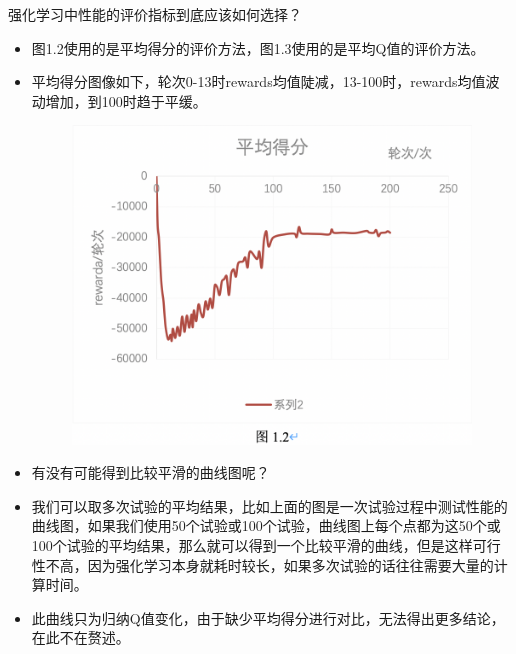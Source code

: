 \documentclass{beamer}
\begin{document}
\begin{frame}{强化学习中性能的评价指标到底应该如何选择？}
    \begin{itemize}
    \tiny
    \item 图1.2使用的是平均得分的评价方法，图1.3使用的是平均Q值的评价方法。
    \item 平均得分图像如下，轮次0-13时rewards均值陡减，13-100时，rewards均值波动增加，到100时趋于平缓。

    
        \begin{minipage}{0.5\linewidth}
        \medskip
        \begin{figure}[h]
            \centering
            \includegraphics[height=.4\textheight]{pic/23.png}
        \end{figure}
    \end{minipage}
    
    \item 有没有可能得到比较平滑的曲线图呢？
    \item 我们可以取多次试验的平均结果，比如上面的图是一次试验过程中测试性能的曲线图，如果我们使用50个试验或100个试验，曲线图上每个点都为这50个或100个试验的平均结果，那么就可以得到一个比较平滑的曲线，但是这样可行性不高，因为强化学习本身就耗时较长，如果多次试验的话往往需要大量的计算时间。
    \item 此曲线只为归纳Q值变化，由于缺少平均得分进行对比，无法得出更多结论，在此不在赘述。

    
    \end{itemize}
    
\end{frame}
\end{document}
